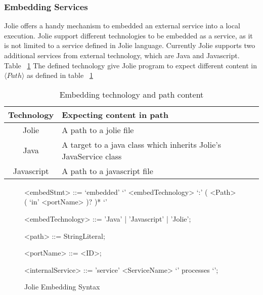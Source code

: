 \subsubsection{Embedding Services}
\label{sec:embedded}
Jolie offers a handy mechanism to embedded an external service into a local execution. Jolie support different technologies to be embedded as a service, as it is not limited to a service defined in Jolie language. Currently Jolie supports two additional services from external technology, which are Java and Javascript. Table ~\ref{table:embedded-technology-path} The defined technology give Jolie program to expect different content in \(\langle Path \rangle\) as defined in table ~\ref{fig:embedded-syntax}

\begin{table}[h]
    \centering
    \begin{tabular}{ |c|l| }
        \hline
        Technology & Expecting content in path                                         \\
        \hline
        Jolie      & A path to a jolie file                                            \\
        Java       & A target to a java class which inherits Jolie's JavaService class \\
        Javascript & A path to a javascript file                                       \\
        \hline
    \end{tabular}
    \caption{Embedding technology and path content}
    \label{table:embedded-technology-path}
\end{table}


\begin{figure}[ht]
    \begin{framed}
        \begin{grammar}
            <embedStmt> ::= `embedded' `{' <embedTechnology> `:' ( <Path> ( `in' <portName> )? )* `}'

            <embedTechnology> ::= 'Java' | 'Javascript' | 'Jolie';

            <path> ::= StringLiteral;

            <portName> ::= <ID>;

            <internalService>
            ::= 'service' <ServiceName> `{' processes `}';
        \end{grammar}
    \end{framed}
    \caption{Jolie Embedding Syntax}
    \label{fig:embedded-syntax}
\end{figure}

